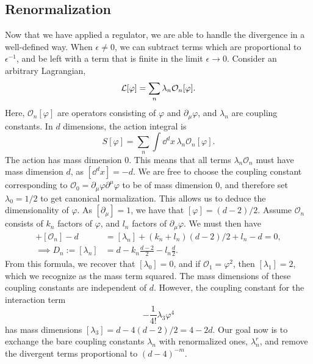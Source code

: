 \subsection{Renormalization}

Now that we have applied a regulator, we are able to handle the divergence in a well-defined way.
When $\epsilon \neq 0$, we can subtract terms which are proportional to $\epsilon^{-1}$, and be left with a term that is finite in the limit $\epsilon \rightarrow 0$.
Consider an arbitrary Lagrangian, 
\begin{equation}
    \mathcal{L}[\varphi] = \sum_n \lambda_n \mathcal{O}_n[\varphi].
\end{equation}
Here, $\mathcal{O}_n[\varphi]$ are operators consisting of $\varphi$ and $\partial_\mu \varphi$, and $\lambda_n$ are coupling constants.
In $d$ dimensions, the action integral is
\begin{equation}
    S[\varphi] = \sum_n \int \dd^d x \, \lambda_n \mathcal{O}_n[\varphi].
\end{equation}
%
The action has mass dimension $0$.
This means that all terms $\lambda_n \mathcal O_n$ must have mass dimension $d$, as $[\dd^d x] = -d$.
We are free to choose the coupling constant corresponding to $\mathcal O_0 = \partial_\mu \varphi \partial^\mu \varphi$ to be of mass dimension 0, and therefore set $\lambda_0 = 1/2$ to get canonical normalization.
This allows us to deduce the dimensionality of $\varphi$.
As $[\partial_\mu] = 1$, we have that $[\varphi] = (d-2)/2$.
Assume $\mathcal O_n$ consists of $k_n$ factors of $\varphi$, and $l_n$ factors of $\partial_\mu \varphi$.
We must then have
\begin{align}
    [\lambda_n] + [\mathcal{O}_n] - d &= [\lambda_n] + (k_n + l_n)(d - 2) / 2 + l_n - d = 0, \\
    \implies D_n := [\lambda_n] &= d - k_n \frac{d - 2}{2} - l_n \frac{d}{2}.
\end{align}
%
From this formula, we recover that $[\lambda_0] = 0$, and if $\mathcal O_1 = \varphi^2$, then $[\lambda_1] = 2$, which we recognize as the mass term squared.
The mass dimensions of these coupling constants are independent of $d$.
However, the coupling constant for the interaction term
\begin{equation}
    - \frac{1}{4!} \lambda_3 \varphi^4
\end{equation}
has mass dimensions $[\lambda_3] = d -4(d-2)/2 = 4 - 2d$.
Our goal now is to exchange the bare coupling constants $\lambda_n$ with renormalized ones, $\lambda_n^r$, and remove the divergent terms proportional to $(d - 4)^{-m}$.
